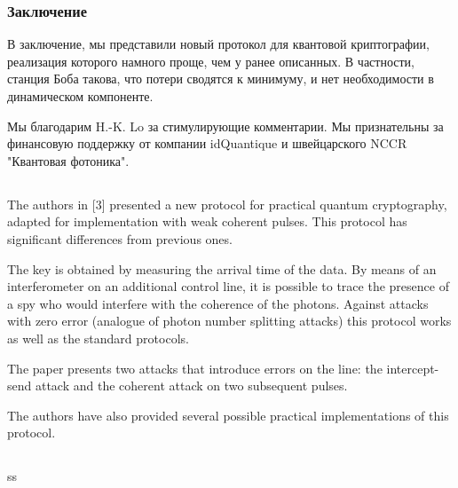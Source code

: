 \subsubsection{Заключение}

В заключение, мы представили новый протокол для квантовой криптографии, реализация которого намного проще, чем у ранее описанных. В частности, станция Боба такова, что потери сводятся к минимуму, и нет необходимости в динамическом компоненте.

Мы благодарим H.-K. Lo за стимулирующие комментарии. Мы признательны за финансовую поддержку от компании idQuantique и швейцарского NCCR "Квантовая фотоника".

\subsection{\review}

The authors in [3] presented a new protocol for practical quantum cryptography, adapted for implementation with weak coherent pulses. This protocol has significant differences from previous ones.

The key is obtained by measuring the arrival time of the data. By means of an interferometer on an additional control line, it is possible to trace the presence of a spy who would interfere with the coherence of the photons. Against attacks with zero error (analogue of photon number splitting attacks) this protocol works as well as the standard protocols.

The paper presents two attacks that introduce errors on the line: the intercept-send attack and the coherent attack on two subsequent pulses.

The authors have also provided several possible practical implementations of this protocol.

\subsection{\dic}
ss